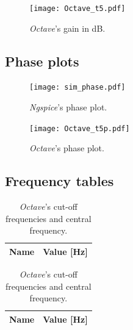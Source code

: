 \begin{figure}[h] \centering
    \texttt{[image: Octave\_t5.pdf]}
    \caption{\emph{Octave}'s gain in dB.}
    \label{fig:MatGain_dB_Comp}
\end{figure}

\clearpage

\subsection{Phase plots}
\begin{figure}[h] \centering
    \texttt{[image: sim\_phase.pdf]}
    \caption{\emph{Ngspice}'s phase plot.}
    \label{fig:SimPhase_Comp}
\end{figure}

\begin{figure}[h] \centering
    \texttt{[image: Octave\_t5p.pdf]}
    \caption{\emph{Octave}'s phase plot.}
    \label{fig:MatPhase_Comp}
\end{figure}

\clearpage

\subsection{Frequency tables}
\begin{table}[h]
    \parbox{.45\linewidth}{
      \centering
      \begin{tabular}{|c|c|}
        \hline
        {\bf Name} & {\bf Value [Hz]} \\ \hline
        
      \end{tabular}
      \caption{\emph{Ngspice}'s cut-off frequencies and central frequency.}\label{tab:SimFreqs_Comp}
    }
    \hfill
    \parbox{.45\linewidth}{
      \centering
      \begin{tabular}{|c|c|}
        \hline
        {\bf Name} & {\bf Value [Hz]} \\ \hline
        
      \end{tabular}
      \caption{\emph{Octave}'s cut-off frequencies and central frequency.}\label{tab:MatFreqs_Comp}
    }
\end{table}


